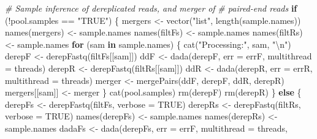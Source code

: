 \documentclass[
]{article}
\newenvironment{Shaded}{\begin{snugshade}}{\end{snugshade}}
\newcommand{\AttributeTok}[1]{\textcolor[rgb]{0.77,0.63,0.00}{#1}}
\newcommand{\CommentTok}[1]{\textcolor[rgb]{0.56,0.35,0.01}{\textit{#1}}}
\newcommand{\ConstantTok}[1]{\textcolor[rgb]{0.00,0.00,0.00}{#1}}
\newcommand{\ControlFlowTok}[1]{\textcolor[rgb]{0.13,0.29,0.53}{\textbf{#1}}}
\newcommand{\FunctionTok}[1]{\textcolor[rgb]{0.00,0.00,0.00}{#1}}
\newcommand{\NormalTok}[1]{#1}
\newcommand{\OtherTok}[1]{\textcolor[rgb]{0.56,0.35,0.01}{#1}}
\newcommand{\SpecialCharTok}[1]{\textcolor[rgb]{0.00,0.00,0.00}{#1}}
\newcommand{\StringTok}[1]{\textcolor[rgb]{0.31,0.60,0.02}{#1}}
\begin{document}
\begin{Shaded}
\begin{Highlighting}[]
\CommentTok{\# Sample inference of dereplicated reads, and merger of}
\CommentTok{\# paired{-}end reads}
\ControlFlowTok{if}\NormalTok{ (}\SpecialCharTok{!}\NormalTok{pool.samples }\SpecialCharTok{==} \StringTok{"TRUE"}\NormalTok{) \{}
\NormalTok{    mergers }\OtherTok{\textless{}{-}} \FunctionTok{vector}\NormalTok{(}\StringTok{"list"}\NormalTok{, }\FunctionTok{length}\NormalTok{(sample.names))}
    \FunctionTok{names}\NormalTok{(mergers) }\OtherTok{\textless{}{-}}\NormalTok{ sample.names}
    \FunctionTok{names}\NormalTok{(filtFs) }\OtherTok{\textless{}{-}}\NormalTok{ sample.names}
    \FunctionTok{names}\NormalTok{(filtRs) }\OtherTok{\textless{}{-}}\NormalTok{ sample.names}
    \ControlFlowTok{for}\NormalTok{ (sam }\ControlFlowTok{in}\NormalTok{ sample.names) \{}
        \FunctionTok{cat}\NormalTok{(}\StringTok{"Processing:"}\NormalTok{, sam, }\StringTok{"}\SpecialCharTok{\textbackslash{}n}\StringTok{"}\NormalTok{)}
\NormalTok{        derepF }\OtherTok{\textless{}{-}} \FunctionTok{derepFastq}\NormalTok{(filtFs[[sam]])}
\NormalTok{        ddF }\OtherTok{\textless{}{-}} \FunctionTok{dada}\NormalTok{(derepF, }\AttributeTok{err =}\NormalTok{ errF, }\AttributeTok{multithread =}\NormalTok{ threads)}
\NormalTok{        derepR }\OtherTok{\textless{}{-}} \FunctionTok{derepFastq}\NormalTok{(filtRs[[sam]])}
\NormalTok{        ddR }\OtherTok{\textless{}{-}} \FunctionTok{dada}\NormalTok{(derepR, }\AttributeTok{err =}\NormalTok{ errR, }\AttributeTok{multithread =}\NormalTok{ threads)}
\NormalTok{        merger }\OtherTok{\textless{}{-}} \FunctionTok{mergePairs}\NormalTok{(ddF, derepF, ddR, derepR)}
\NormalTok{        mergers[[sam]] }\OtherTok{\textless{}{-}}\NormalTok{ merger}
\NormalTok{    \}}
    \FunctionTok{cat}\NormalTok{(pool.samples)}
    \FunctionTok{rm}\NormalTok{(derepF)}
    \FunctionTok{rm}\NormalTok{(derepR)}
\NormalTok{\} }\ControlFlowTok{else}\NormalTok{ \{}
\NormalTok{    derepFs }\OtherTok{\textless{}{-}} \FunctionTok{derepFastq}\NormalTok{(filtFs, }\AttributeTok{verbose =} \ConstantTok{TRUE}\NormalTok{)}
\NormalTok{    derepRs }\OtherTok{\textless{}{-}} \FunctionTok{derepFastq}\NormalTok{(filtRs, }\AttributeTok{verbose =} \ConstantTok{TRUE}\NormalTok{)}
    \FunctionTok{names}\NormalTok{(derepFs) }\OtherTok{\textless{}{-}}\NormalTok{ sample.names}
    \FunctionTok{names}\NormalTok{(derepRs) }\OtherTok{\textless{}{-}}\NormalTok{ sample.names}
\NormalTok{    dadaFs }\OtherTok{\textless{}{-}} \FunctionTok{dada}\NormalTok{(derepFs, }\AttributeTok{err =}\NormalTok{ errF, }\AttributeTok{multithread =}\NormalTok{ threads, }

\end{Highlighting}
\end{Shaded}
\end{document}
